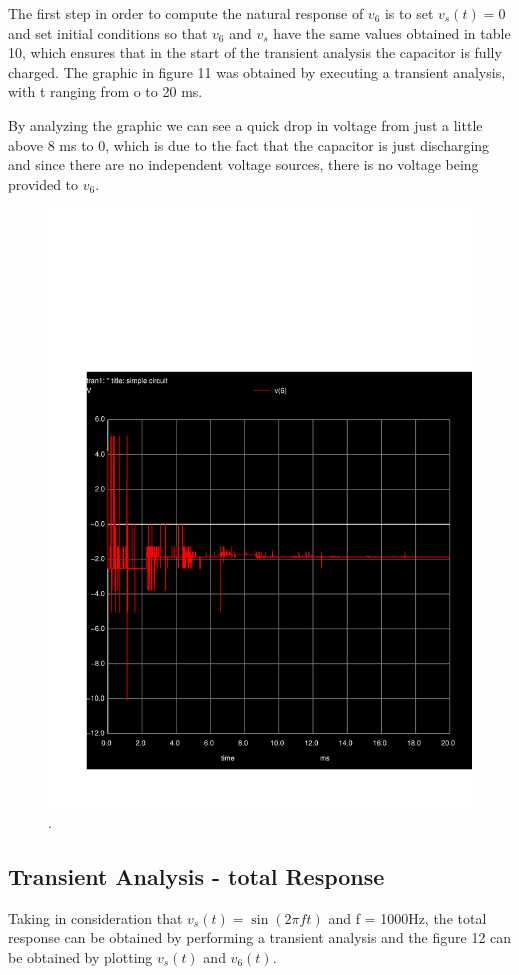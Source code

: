 The first step in order to compute the natural response of $v_6$ is to set $v_s(t) = 0$ and set initial conditions so that $v_6$ and $v_s$ have the same values obtained in table 10, which ensures that in the start of the transient analysis the capacitor is fully charged. The graphic in figure 11 was obtained by executing a transient analysis, with t ranging from o to 20 ms.

By analyzing the graphic we can see a quick drop in voltage from just a little above 8 ms to 0, which is due to the fact that the capacitor is just discharging and since there are no independent voltage sources, there is no voltage being provided to $v_6$.

\begin{figure}[h] \centering
\includegraphics[width=0.6\linewidth]{trans.pdf}
\caption{.}
\label{fig:rc1}
\end{figure}


\subsection{Transient Analysis - total Response}

Taking in consideration that $v_s(t) = \sin(2\pi ft)$ and f = 1000Hz, the total response can be obtained by performing a transient analysis and the figure 12 can be obtained by plotting $v_s(t)$ and $v_6(t)$. 


